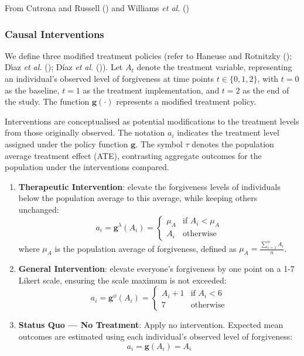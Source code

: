 \documentclass[
  single column]{article}
\begin{document}
From Cutrona and Russell () and Williams
\emph{et al.} ()

\subsubsection{Causal Interventions}\label{causal-interventions}

We define three modified treatment policies (refer to Haneuse and
Rotnitzky (); Dı́az \emph{et
al.} (); Díaz \emph{et al.}
()). Let \(A_t\) denote the treatment
variable, representing an individual's observed level of forgiveness at
time points \(t \in \{0,1,2\}\), with \(t=0\) as the baseline, \(t=1\)
as the treatment implementation, and \(t=2\) as the end of the study.
The function \(\mathbf{g}(\cdot)\) represents a modified treatment
policy.

Interventions are conceptualised as potential modifications to the
treatment levels from those originally observed. The notation \(a_i\)
indicates the treatment level assigned under the policy function
\(\mathbf{g}\). The symbol \(\tau\) denotes the population average
treatment effect (ATE), contrasting aggregate outcomes for the
population under the interventions compared.

\begin{enumerate}
\def\labelenumi{\arabic{enumi}.}
\item
  \textbf{Therapeutic Intervention}: elevate the forgiveness levels of
  individuals below the population average to this average, while
  keeping others unchanged: \[
  a_i = \mathbf{g}^\lambda(A_i) = \begin{cases} 
  \mu_A & \text{if } A_i < \mu_A \\ 
  A_i & \text{otherwise} 
  \end{cases}
  \] where \(\mu_A\) is the population average of forgiveness, defined
  as \(\mu_A = \frac{\sum_{i=1}^n A_i}{n}\).
\item
  \textbf{General Intervention}: elevate everyone's forgiveness by one
  point on a 1-7 Likert scale, ensuring the scale maximum is not
  exceeded: \[
  a_i = \mathbf{g}^\phi(A_i) = \begin{cases} 
  A_i + 1 & \text{if } A_i < 6 \\ 
  7 & \text{otherwise} 
  \end{cases}
  \]
\item
  \textbf{Status Quo --- No Treatment}: Apply no intervention. Expected
  mean outcomes are estimated using each individual's observed level of
  forgiveness: \[
  a_i = \mathbf{g}(A_i) = A_i
  \]
\end{enumerate}
\end{document}
